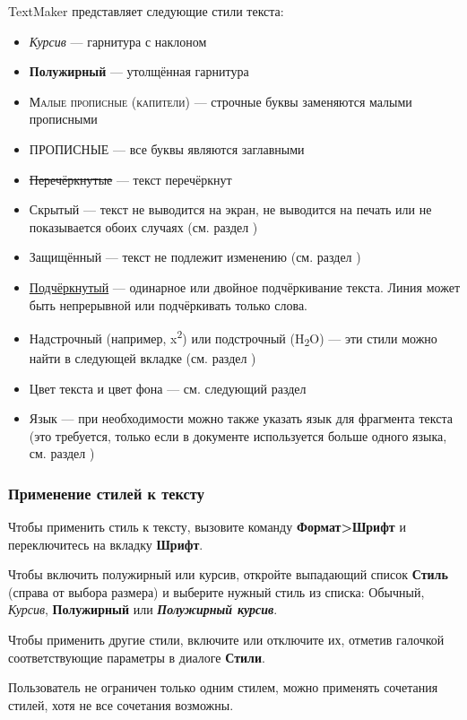 ﻿\documentclass[a4paper,10pt]{article}
\begin{document}
TextMaker представляет следующие стили текста:
\begin{itemize}
 \item \textit{Курсив} — гарнитура с наклоном
 \item \textbf{Полужирный} — утолщённая гарнитура
 \item \textsc{Малые прописные (капители)} — строчные буквы заменяются малыми прописными
 \item ПРОПИСНЫЕ — все буквы являются заглавными
 \item \sout{Перечёркнутые} — текст перечёркнут
 \item Скрытый — текст не выводится на экран, не выводится на печать или не показывается обоих случаях (см. раздел )
 \item Защищённый — текст не подлежит изменению (см. раздел )
 \item \underline{Подчёркнутый} — одинарное или двойное подчёркивание текста. Линия может быть непрерывной или подчёркивать только слова.
 \item Надстрочный (например, x\textsuperscript{2}) или подстрочный (H\textsubscript{2}O) — эти стили можно найти в следующей вкладке (см. раздел )
 \item Цвет текста и цвет фона — см. следующий раздел
 \item Язык — при необходимости можно также указать язык для фрагмента текста (это требуется, только если в документе используется больше одного языка, см. раздел )
\end{itemize}

\subsubsection{Применение стилей к тексту}
Чтобы применить стиль к тексту, вызовите команду \textbf{Формат>Шрифт} и переключитесь на вкладку \textbf{Шрифт}.

Чтобы включить полужирный или курсив, откройте выпадающий список \textbf{Стиль} (справа от выбора размера) и выберите нужный стиль из списка: Обычный, \textit{Курсив}, \textbf{Полужирный} или \textit{\textbf{Полужирный курсив}}.

Чтобы применить другие стили, включите или отключите их, отметив галочкой соответствующие параметры в диалоге \textbf{Стили}.

Пользователь не ограничен только одним стилем, можно применять сочетания стилей, хотя не все сочетания возможны.
\end{document}
